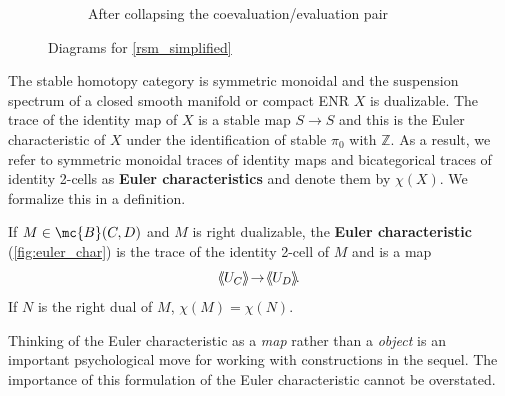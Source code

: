 \documentclass[11pt]{amsart}
\def\shvar#1#2{{\ensuremath{%
  \hspace{1mm}\makebox[-1mm]{$#1\langle$}\makebox[0mm]{$#1\langle$}\hspace{1mm}%
  {#2}%
  \makebox[1mm]{$#1\rangle$}\makebox[0mm]{$#1\rangle$}%
}}}
\def\sh{\shvar{}}
\begin{document}
\begin{figure}
\begin{subfigure}[t]{.3\linewidth}
\caption{After collapsing the coevaluation/evaluation pair} 
\label{fig:morita_trace_2}
\end{subfigure}
\caption{Diagrams for \cref{rsm_simplified}}
\end{figure}



The stable homotopy category is symmetric monoidal and the suspension spectrum of a closed smooth manifold or compact ENR $X$ is dualizable.   The trace of the identity map 
of $X$ is a stable map $S\to S$ and this is the Euler characteristic of $X$ under the identification of stable $\pi_0$ with $\mathbb{Z}$.  As a result, we refer to symmetric monoidal traces
of identity maps and bicategorical traces of identity 2-cells as {\bf Euler characteristics} and denote them by $\chi(X)$. We formalize this in a definition.

\begin{defn}\label{defn:euler_characteristic}
  If $M\in \mc{B}(C,D)$ and $M$ is right dualizable, the \textbf{Euler characteristic} (\cref{fig:euler_char}) is the trace of the identity 2-cell of $M$ and is a map \[\sh{U_C}\to \sh{U_D}.\]   
If $N$ is the right dual of $M$, $\chi(M)=\chi(N)$.
\end{defn}

\begin{rmk}
  Thinking of the Euler characteristic as a \textit{map} rather than a \textit{object} is an important psychological move for working with constructions in the sequel. The importance of this formulation of the Euler characteristic cannot be overstated.
\end{rmk}
\end{document}
